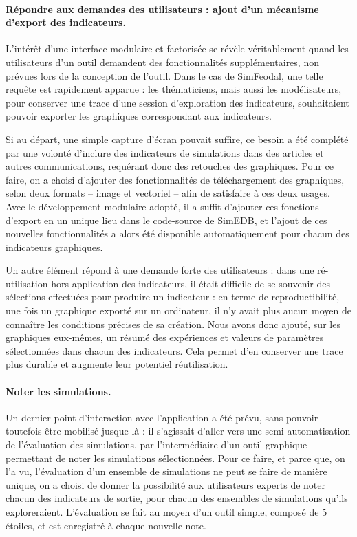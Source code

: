 \paragraph{Répondre aux demandes des utilisateurs : ajout d'un mécanisme d'export des indicateurs.}

L'intérêt d'une interface modulaire et factorisée se révèle véritablement quand les utilisateurs d'un outil demandent des fonctionnalités supplémentaires, non prévues lors de la conception de l'outil.
Dans le cas de SimFeodal, une telle requête est rapidement apparue : les thématiciens, mais aussi les modélisateurs, pour conserver une trace d'une session d'exploration des indicateurs, souhaitaient pouvoir exporter les graphiques correspondant aux indicateurs.

Si au départ, une simple capture d'écran pouvait suffire, ce besoin a été complété par une volonté d'inclure des indicateurs de simulations dans des articles et autres communications, requérant donc des retouches des graphiques.
Pour ce faire, on a choisi d'ajouter des fonctionnalités de téléchargement des graphiques, selon deux formats -- image et vectoriel -- afin de satisfaire à ces deux usages.
Avec le développement modulaire adopté, il a suffit d'ajouter ces fonctions d'export en un unique lieu dans le code-source de SimEDB, et l'ajout de ces nouvelles fonctionnalités a alors été disponible automatiquement pour chacun des indicateurs graphiques.

Un autre élément répond à une demande forte des utilisateurs : dans une ré-utilisation hors application des indicateurs, il était difficile de se souvenir des sélections effectuées pour produire un indicateur : en terme de reproductibilité, une fois un graphique exporté sur un ordinateur, il n'y avait plus aucun moyen de connaître les conditions précises de sa création.
Nous avons donc ajouté, sur les graphiques eux-mêmes, un résumé des expériences et valeurs de paramètres sélectionnées dans chacun des indicateurs.
Cela permet d'en conserver une trace plus durable et augmente leur potentiel réutilisation.

\paragraph{Noter les simulations.}

Un dernier point d'interaction avec l'application a été prévu, sans pouvoir toutefois être mobilisé jusque là : il s'agissait d'aller vers une semi-automatisation de l'évaluation des simulations, par l'intermédiaire d'un outil graphique permettant de \og noter\fg{} les simulations sélectionnées.
Pour ce faire, et parce que, on l'a vu, l'évaluation d'un ensemble de simulations ne peut se faire de manière unique, on a choisi de donner la possibilité aux utilisateurs experts de noter chacun des indicateurs de sortie, pour chacun des ensembles de simulations qu'ils exploreraient.
L'évaluation se fait au moyen d'un outil simple, composé de 5 \og étoiles\fg{}, et est enregistré à chaque nouvelle note.

